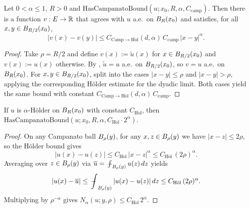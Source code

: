 \begin{theorem}
\label{thm:campanato_implies_holder}
\leanok
{}
Let $0 < \alpha \le 1$, $R > 0$ and $\mathrm{HasCampanatoBound}(u; x_0, R, \alpha, C_{\mathrm{camp}})$.
Then there is a function $v : E \to \mathbb{R}$ that agrees with $u$ a.e.\ on $B_{R}(x_0)$ and
satisfies, for all $x, y \in B_{R/2}(x_0)$,
\begin{equation*}
\bigl|v(x) - v(y)\bigr|
\le C_{\mathrm{Camp\to H\ddot ol}}(d,\alpha)\, C_{\mathrm{camp}}\, \lvert x - y\rvert^{\alpha}.
\end{equation*}
\end{theorem}
\begin{proof}
\leanok
{}

Take $\rho = R/2$ and define $v(x) := \widetilde u(x)$ for $x \in B_{R/2}(x_0)$ and
$v(x) := u(x)$ otherwise. By
, $\widetilde u = u$ a.e.\ on
$B_{R/2}(x_0)$, so $v = u$ a.e.\ on $B_{R}(x_0)$. For $x, y \in B_{R/2}(x_0)$,
split into the cases $|x - y| \le \rho$ and $|x - y| > \rho$, applying the corresponding
H\"older estimate for the dyadic limit. Both cases yield the same bound with constant
$C_{\mathrm{Camp\to H\ddot ol}}(d,\alpha)\, C_{\mathrm{camp}}$.
\end{proof}

\begin{lemma}
\label{lem:holder_hasCampanatoBound}
\leanok
{}
If $u$ is $\alpha$-H\"older on $B_{R}(x_0)$ with constant $C_{\mathrm{H\ddot ol}}$, then
$\mathrm{HasCampanatoBound}(u; x_0, R, \alpha, C_{\mathrm{H\ddot ol}}\cdot 2^{\alpha})$.
\end{lemma}
\begin{proof}
\leanok

On any Campanato ball $B_{\rho}(y)$, for any $x, z \in B_{\rho}(y)$ we have
$|x - z| \le 2\rho$, so the H\"older bound gives
\begin{equation*}
|u(x) - u(z)| \le C_{\mathrm{H\ddot ol}}\,\lvert x - z\rvert^{\alpha}
\le C_{\mathrm{H\ddot ol}}\,(2\rho)^{\alpha}.
\end{equation*}
Averaging over $z \in B_{\rho}(y)$ via $\overline u = \fint_{\Ball{\rho}{y}} u(z)\,dz$
yields
\begin{equation*}
|u(x) - \overline u| \le \fint_{\Ball{\rho}{y}} |u(x) - u(z)|\,dz
\le C_{\mathrm{H\ddot ol}}\,(2\rho)^{\alpha}.
\end{equation*}
Multiplying by $\rho^{-\alpha}$ gives
$N_{\alpha}(u; y, \rho) \le C_{\mathrm{H\ddot ol}}\, 2^{\alpha}$.
\end{proof}

